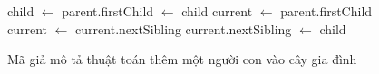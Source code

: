 \begin{figure}[htbp]
	\vspace*{-\baselineskip}
	\centering
	\begin{algorithm}[H]
		\footnotesize
		\caption{Thêm con vào danh sách anh chị em}
		\begin{algorithmic}[1]
			\State child $\gets$ 
			 
			\State parent.firstChild $\gets$ child 
			\Else
			\State current $\gets$ parent.firstChild
			\State current $\gets$ current.nextSibling
			\EndWhile
			\State current.nextSibling $\gets$ child 
			\EndIf
		\end{algorithmic}
	\end{algorithm}
	\vspace*{-\baselineskip}
	\caption{Mã giả mô tả thuật toán thêm một người con vào cây gia đình}
	\label{fig:themCon}
	\vspace*{-\baselineskip}
\end{figure}